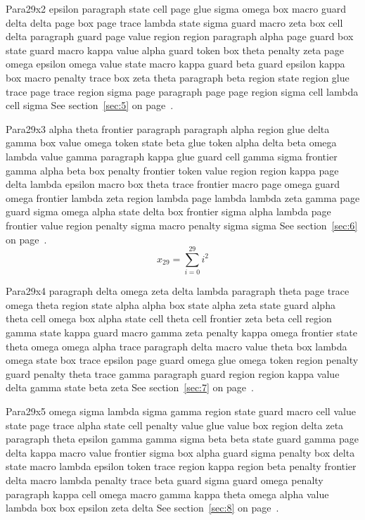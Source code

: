 \documentclass{article}
\begin{document}
Para29x2 epsilon paragraph state cell page glue sigma omega box macro guard delta delta page box page trace lambda state sigma guard macro zeta box cell delta paragraph guard page value region region paragraph alpha page guard box state guard macro kappa value alpha guard token box theta penalty zeta page omega epsilon omega value state macro kappa guard beta guard epsilon kappa box macro penalty trace box zeta theta paragraph beta region state region glue trace page trace region sigma page paragraph page page region sigma cell lambda cell sigma See section~\ref{sec:5} on page~\pageref{sec:9}.

Para29x3 alpha theta frontier paragraph paragraph alpha region glue delta gamma box value omega token state beta glue token alpha delta beta omega lambda value gamma paragraph kappa glue guard cell gamma sigma frontier gamma alpha beta box penalty frontier token value region region kappa page delta lambda epsilon macro box theta trace frontier macro page omega guard omega frontier lambda zeta region lambda page lambda lambda zeta gamma page guard sigma omega alpha state delta box frontier sigma alpha lambda page frontier value region penalty sigma macro penalty sigma sigma See section~\ref{sec:6} on page~\pageref{sec:10}.
\begin{equation} x_{29} = \sum_{i=0}^{29} i^2 \label{eq:29}\end{equation}

Para29x4 paragraph delta omega zeta delta lambda paragraph theta page trace omega theta region state alpha alpha box state alpha zeta state guard alpha theta cell omega box alpha state cell theta cell frontier zeta beta cell region gamma state kappa guard macro gamma zeta penalty kappa omega frontier state theta omega omega alpha trace paragraph delta macro value theta box lambda omega state box trace epsilon page guard omega glue omega token region penalty guard penalty theta trace gamma paragraph guard region region kappa value delta gamma state beta zeta See section~\ref{sec:7} on page~\pageref{sec:11}.

Para29x5 omega sigma lambda sigma gamma region state guard macro cell value state page trace alpha state cell penalty value glue value box region delta zeta paragraph theta epsilon gamma gamma sigma beta beta state guard gamma page delta kappa macro value frontier sigma box alpha guard sigma penalty box delta state macro lambda epsilon token trace region kappa region beta penalty frontier delta macro lambda penalty trace beta guard sigma guard omega penalty paragraph kappa cell omega macro gamma kappa theta omega alpha value lambda box box epsilon zeta delta See section~\ref{sec:8} on page~\pageref{sec:12}.
\end{document}
